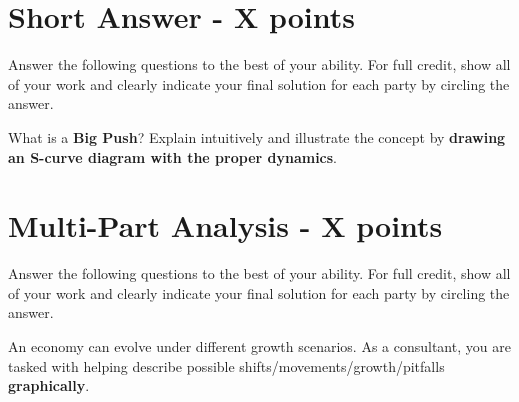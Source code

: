 \documentclass[12pt]{exam}
\begin{document}
\begin{questions}
\newpage
\section*{Short Answer - X points}
Answer the following questions to the best of your ability.
For full credit, show all of your work and clearly indicate your final solution for each party by circling the answer.

\question 
What is a \textbf{Big Push}? 
Explain intuitively and illustrate the concept by \textbf{drawing an S-curve diagram with the proper dynamics}. 

\newpage
\section*{Multi-Part Analysis - X points}
Answer the following questions to the best of your ability.
For full credit, show all of your work and clearly indicate your final solution for each party by circling the answer.

\question 
An economy can evolve under different growth scenarios. 
As a consultant, you are tasked with helping describe possible shifts/movements/growth/pitfalls \textbf{graphically}.


\end{questions}
\end{document}
